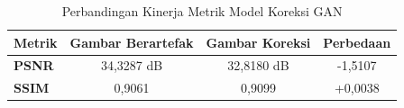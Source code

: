 \begin{table}[H]
	\centering
	\caption{Perbandingan Kinerja Metrik Model Koreksi GAN}
	\label{tb:gan-perf}
	
	\vspace{2ex}
	
	\begin{tabularx}{\textwidth}{|X|c|c|c|}
		\hline
		\rowcolor[HTML]{C0C0C0}
		\textbf{Metrik} & \textbf{Gambar Berartefak} & \textbf{Gambar Koreksi} & \textbf{Perbedaan}\\ \hline
		
		\textbf{PSNR} & 34,3287 dB & 32,8180 dB & -1,5107  \\ \hline
		\textbf{SSIM} & 0,9061 & 0,9099 & +0,0038 \\ \hline
	\end{tabularx}
\end{table}